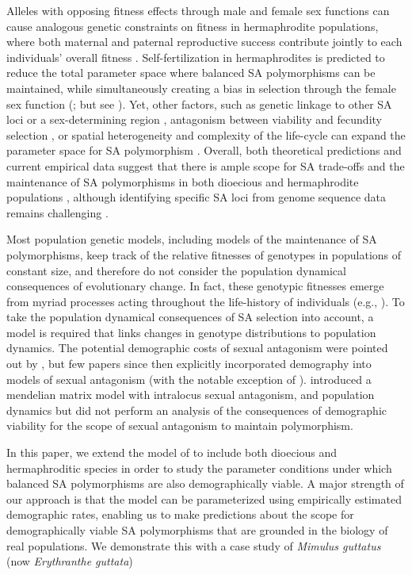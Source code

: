 \documentclass[11pt,draft]{article}
\begin{document}
Alleles with opposing fitness effects through male and female sex functions can cause analogous genetic constraints on fitness in hermaphrodite populations, where both maternal and paternal reproductive success contribute jointly to each individuals' overall fitness \citep{LloydWebb1986, WebbLloyd1986, Abbott2011, JordanConnallon2014}. Self-fertilization in hermaphrodites is predicted to reduce the total parameter space where balanced SA polymorphisms can be maintained, while simultaneously creating a bias in selection through the female sex function (\citealt{JordanConnallon2014,Glemin2021}; but see \citealt{Tazzyman2015}). Yet, other factors, such as genetic linkage to other SA loci or a sex-determining region \citep{Otto2011, JordanCharlesworth2012, Olito2017, Olito2019}, antagonism between viability and fecundity selection \citep{Glemin2021}, or spatial heterogeneity and complexity of the life-cycle can expand the parameter space for SA polymorphism \citep{Olito-etal-2018,ConnallonSharmaOlito2019, Glemin2021}. Overall, both theoretical predictions and current empirical data suggest that there is ample scope for SA trade-offs and the maintenance of SA polymorphisms in both dioecious and hermaphrodite populations \citep{Abbott2011, WangBarrett2020}, although identifying specific SA loci from genome sequence data remains challenging \citep{RuzickaESEB2020}.

Most population genetic models, including models of the maintenance of SA polymorphisms, keep track of the relative fitnesses of genotypes in populations of constant size, and therefore do not consider the population dynamical consequences of evolutionary change. In fact, these genotypic fitnesses emerge from myriad processes acting throughout the life-history of individuals (e.g., \citealt {johnston2013life, merot2020balancing}). To take the population dynamical consequences of SA selection into account, a model is required that links changes in genotype distributions to population dynamics. The potential demographic costs of sexual antagonism were pointed out by \cite{kokko2003sexy}, but few papers since then explicitly incorporated demography into models of sexual antagonism (with the notable exception of \citealt{harts2014demography}). \citet{deVriesCaswell2019a} introduced a mendelian matrix model with intralocus sexual antagonism, and population dynamics but did not perform an analysis of the consequences of demographic viability for the scope of sexual antagonism to maintain polymorphism. 

In this paper, we extend the model of \citep{deVriesCaswell2019a,deVriesCaswell2019b} to include both dioecious and hermaphroditic species in order to study the parameter conditions under which balanced SA polymorphisms are also demographically viable. A major strength of our approach is that the model can be parameterized using empirically estimated demographic rates, enabling us to make predictions about the scope for demographically viable SA polymorphisms that are grounded in the biology of real populations. We demonstrate this with a case study of {\itshape Mimulus guttatus} (now {\itshape Erythranthe guttata})
\end{document}
